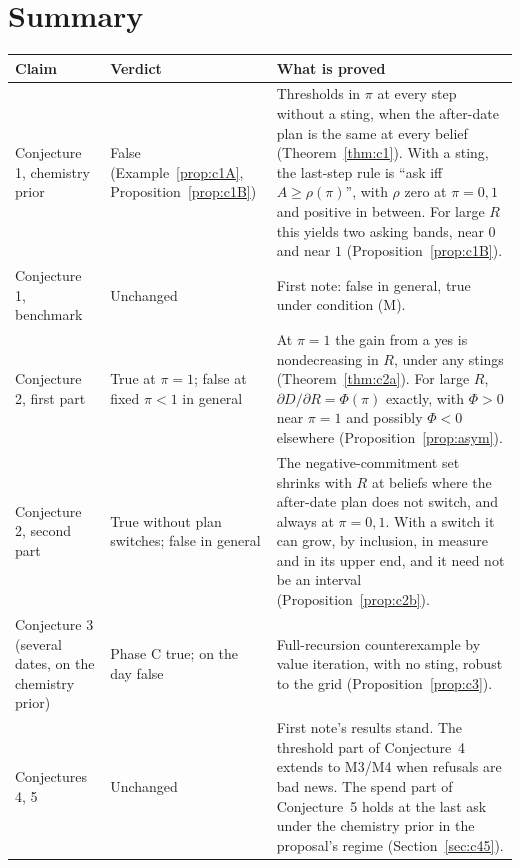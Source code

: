 \documentclass[11pt,a4paper]{article}
\theoremstyle{definition}
\theoremstyle{remark}
\begin{document}
\section*{Summary}
\begin{center}
\small
\begin{tabular}{@{}>{\raggedright\arraybackslash}p{2.7cm}>{\raggedright\arraybackslash}p{3.4cm}>{\raggedright\arraybackslash}p{8.6cm}@{}}
\toprule
Claim & Verdict & What is proved \\
\midrule
Conjecture 1, chemistry prior & False (Example~\ref{prop:c1A}, Proposition~\ref{prop:c1B}) & Thresholds in $\pi$ at every step without a sting, when the after-date plan is the same at every belief (Theorem~\ref{thm:c1}). With a sting, the last-step rule is ``ask iff $A\ge\rho(\pi)$'', with $\rho$ zero at $\pi=0,1$ and positive in between. For large $R$ this yields two asking bands, near $0$ and near $1$ (Proposition~\ref{prop:c1B}). \\[2pt]
Conjecture 1, benchmark & Unchanged & First note: false in general, true under condition (M). \\[2pt]
Conjecture 2, first part & True at $\pi=1$; false at fixed $\pi<1$ in general & At $\pi=1$ the gain from a yes is nondecreasing in $R$, under any stings (Theorem~\ref{thm:c2a}). For large $R$, $\partial D/\partial R=\Phi(\pi)$ exactly, with $\Phi>0$ near $\pi=1$ and possibly $\Phi<0$ elsewhere (Proposition~\ref{prop:asym}). \\[2pt]
Conjecture 2, second part & True without plan switches; false in general & The negative-commitment set shrinks with $R$ at beliefs where the after-date plan does not switch, and always at $\pi=0,1$. With a switch it can grow, by inclusion, in measure and in its upper end, and it need not be an interval (Proposition~\ref{prop:c2b}). \\[2pt]
Conjecture 3 (several dates, on the chemistry prior) & Phase C true; on the day false & Full-recursion counterexample by value iteration, with no sting, robust to the grid (Proposition~\ref{prop:c3}). \\[2pt]
Conjectures 4, 5 & Unchanged & First note's results stand. The threshold part of Conjecture~4 extends to M3/M4 when refusals are bad news. The spend part of Conjecture~5 holds at the last ask under the chemistry prior in the proposal's regime (Section~\ref{sec:c45}). \\
\bottomrule
\end{tabular}
\end{center}
\end{document}
